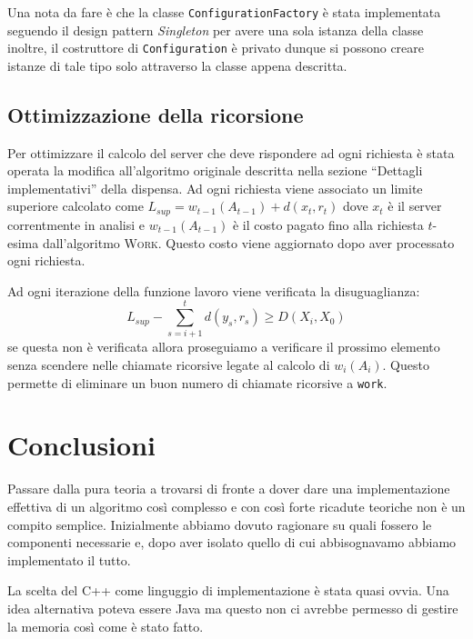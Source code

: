 \documentclass[a4paper, 10pt]{article}
\begin{document}
Una nota da fare è che la classe \texttt{ConfigurationFactory} è stata 
implementata seguendo il design pattern \emph{Singleton} per avere una sola
istanza della classe inoltre, il costruttore di \texttt{Configuration} è 
privato dunque si possono creare istanze di tale tipo solo attraverso la 
classe appena descritta. 

\subsection{Ottimizzazione della ricorsione}
Per ottimizzare il calcolo del server che deve rispondere ad ogni richiesta 
è stata operata la modifica all'algoritmo originale descritta nella sezione
``Dettagli implementativi'' della dispensa. Ad ogni richiesta viene associato
un limite superiore calcolato come $L_{sup} = w_{t - 1}(A_{t - 1}) + d(x_t, r_t)$ 
dove $x_t$ è il server correntmente in analisi e $w_{t - 1}(A_{t - 1})$ è il
costo pagato fino alla richiesta $t$-esima dall'algoritmo \textsc{Work}. Questo
costo viene aggiornato dopo aver processato ogni richiesta. 

Ad ogni iterazione della funzione lavoro viene verificata la disuguaglianza:
\[
  L_{sup} - \sum_{s = i + 1}^{t} d(y_s, r_s) \geq D(X_i, X_0)
\]
se questa non è verificata allora proseguiamo a verificare il prossimo elemento
senza scendere nelle chiamate ricorsive legate al calcolo di $w_i(A_i)$. Questo
permette di eliminare un buon numero di chiamate ricorsive a \texttt{work}. 

\section{Conclusioni}
Passare dalla pura teoria a trovarsi di fronte a dover dare una implementazione 
effettiva di un algoritmo così complesso e con così forte ricadute teoriche 
non è un compito semplice. Inizialmente abbiamo dovuto ragionare su quali 
fossero le componenti necessarie e, dopo aver isolato quello di cui 
abbisognavamo abbiamo implementato il tutto. 

La scelta del C++ come linguggio di implementazione è stata quasi ovvia. Una 
idea alternativa poteva essere Java ma questo non ci avrebbe permesso di 
gestire la memoria così come è stato fatto.  
\end{document}
